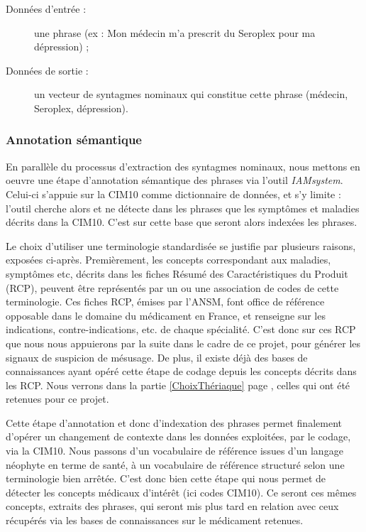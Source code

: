 \documentclass[a4paper, 12pt, openany, oneside, abstract=on]{article} %
\begin{document}
\begin{description}
    \item[Données d'entrée :] une phrase (ex : Mon médecin m'a prescrit du Seroplex pour ma dépression) ;
    \item[Données de sortie :] un vecteur de syntagmes nominaux qui constitue cette phrase (médecin, Seroplex, dépression).
\end{description}

\subsubsection{Annotation sémantique}
En parallèle du processus d'extraction des syntagmes nominaux, nous mettons en oeuvre une étape d'annotation sémantique des phrases via l'outil \emph{IAMsystem}\cite{Jouhet2018}. Celui-ci s'appuie sur la CIM10 comme dictionnaire de données, et s'y limite : l'outil cherche alors et ne détecte dans les phrases que les symptômes et maladies décrits dans la CIM10. C'est sur cette base que seront alors indexées les phrases.

Le choix d'utiliser une terminologie standardisée se justifie par plusieurs raisons, exposées ci-après.
Premièrement, les concepts correspondant aux maladies, symptômes etc, décrits dans les fiches Résumé des Caractéristiques du Produit (RCP), peuvent être représentés par un ou une association de codes de cette terminologie. Ces fiches RCP, émises par l'ANSM, font office de référence opposable dans le domaine du médicament en France, et renseigne sur les indications, contre-indications, etc. de chaque spécialité. C'est donc sur ces RCP que nous nous appuierons par la suite dans le cadre de ce projet, pour générer les signaux de suspicion de mésusage. De plus, il existe déjà des bases de connaissances ayant opéré cette étape de codage depuis les concepts décrits dans les RCP. Nous verrons dans la partie \ref{ChoixThériaque} page \pageref{ChoixThériaque}, celles qui ont été retenues pour ce projet.

Cette étape d'annotation et donc d'indexation des phrases permet finalement d'opérer un changement de contexte dans les données exploitées, par le codage, via la CIM10. Nous passons d'un vocabulaire de référence issues d'un langage \og{}néophyte\fg{} en terme de santé, à un vocabulaire de référence structuré selon une terminologie bien arrêtée.
C'est donc bien cette étape qui nous permet de détecter les concepts médicaux d'intérêt (ici codes CIM10). Ce seront ces mêmes concepts, extraits des phrases, qui seront mis plus tard en relation avec ceux récupérés via les bases de connaissances sur le médicament retenues.
\end{document}
